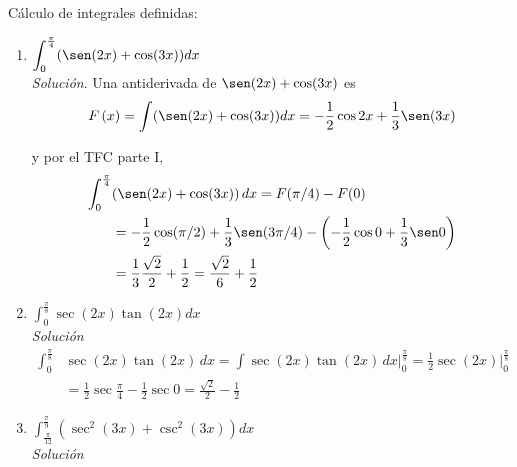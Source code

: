 \begin{ejemplo}
\textnormal{Cálculo de integrales definidas:}
\end{ejemplo}
\begin{enumerate}[leftmargin=1.2em,   itemindent=0pt,       labelwidth=\labelwidth,labelsep=0.5em,]

	
\item $\displaystyle{\int_{0}^{\frac{\pi }{4}}(\sen (2x)+\cos (3x))dx}$\\

\textit{Solución}. Una antiderivada de $\sen (2x)+\cos (3x)$ es
\[
F\left( x\right) =\int (\sen (2x)+\cos (3x))dx=-\frac{1}{2}\cos 2x+\frac{1}{3}\sen (3x)
\]

y por el TFC parte I,
{\small
\begin{align*}
\int_{0}^{\frac{\pi }{4}}&(\sen (2x)+\cos (3x))\,dx=F(\pi/4)-F(0)\\
&=-\frac{1}{2}\cos(\pi/2)+\frac{1}{3}\sen (3\pi/4)-\left(-\frac{1}{2}\cos 0+\frac{1}{3}\sen 0\right)\\
&=\frac{1}{3}\frac{\sqrt{2}}{2}+\frac{1}{2}=\frac{\sqrt{2}}{6}+\frac{1}{2}
\end{align*}
}

\item $\displaystyle{\int_{0}^{\frac{\pi }{8}}\sec (2x)\tan (2x)dx}$\\

\textit{Solución}
{\small
\begin{align*}
\int_{0}^{\frac{\pi }{8}}&\sec (2x)\tan (2x)\,dx=\int \sec(2x)\tan(2x)\,dx \Big|_{0}^{\frac{\pi }{8}}=\frac{1}{2}\sec(2x)\Big|_{0}^{\frac{\pi }{8}}\\
&=\frac{1}{2}\sec \frac{\pi }{4}-\frac{1}{2}\sec0=\frac{\sqrt{2}}{2}-\frac{1}{2}
\end{align*}
}

\item $\displaystyle{\int_{\frac{\pi }{12}}^{\frac{\pi }{9}}(\sec ^{2}(3x)+\csc^{2}(3x))dx}$\\


\textit{Solución}




\end{enumerate}
